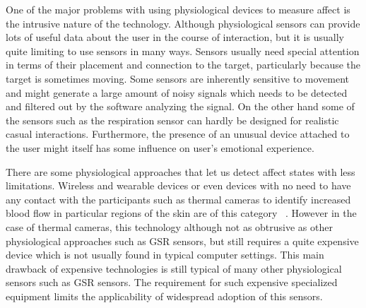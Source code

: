 One of the major problems with using physiological devices to measure affect is the intrusive nature of the technology. Although physiological sensors can provide lots of useful data about the user in the course of interaction, but  it is usually quite limiting to use sensors in many ways. Sensors usually need special attention in terms of their placement and connection to the target, particularly because the target is sometimes moving. Some sensors are inherently sensitive to movement and might generate a large amount of noisy signals which needs to be detected and filtered out by the software analyzing the signal. On the other hand some of the sensors such as the respiration sensor can hardly be designed for realistic casual interactions. Furthermore, the presence of an unusual device attached to the user might itself has some influence on user's emotional experience.

There are some physiological approaches that let us detect affect states with less limitations. Wireless and wearable devices or even devices with no need to have any contact with the participants such as thermal cameras to identify increased blood flow in particular regions of the skin are of this category ~\cite{puri2005stresscam}. However in the case of thermal cameras, this technology although not as obtrusive as other physiological approaches such as GSR sensors, but still requires a quite expensive device which is not usually found in typical computer settings. This main drawback of expensive technologies is still typical of many other physiological sensors such as GSR sensors. The requirement for such expensive specialized equipment limits the applicability of widespread adoption of this sensors.
